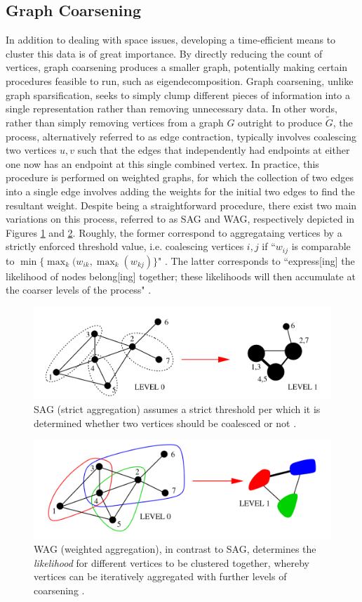 \documentclass{article}
\begin{document}
\subsection{Graph Coarsening}
In addition to dealing with space issues, developing a time-efficient means to cluster this data is of great importance. By directly reducing the count of vertices, graph coarsening produces a smaller graph, potentially making certain procedures feasible to run, such as eigendecomposition. Graph coarsening, unlike graph sparsification, seeks to simply clump different pieces of information into a single representation rather than removing unnecessary data. In other words, rather than simply removing vertices from a graph $G$ outright to produce $\widetilde{G}$, the process, alternatively referred to as edge contraction, typically involves coalescing two vertices $u,v$ such that the edges that independently had endpoints at either one now has an endpoint at this single combined vertex. In practice, this procedure is performed on weighted graphs, for which the collection of two edges into a single edge involves adding the weights for the initial two edges to find the resultant weight. Despite being a straightforward procedure, there exist two main variations on this process, referred to as SAG and WAG, respectively depicted in Figures \ref{fig:sag} and  \ref{fig:wag}. Roughly, the former correspond to aggregataing vertices by a strictly enforced threshold value, i.e. coalescing vertices $i,j$ if ``$w_{ij}$ is comparable to $\min\{\max_k(w_{ik}, \max_k(w_{kj})\}$" \cite{coarsening}. The latter corresponds to ``express[ing]  the likelihood of nodes belong[ing] together; these likelihoods will then accumulate at the coarser levels of the process" \cite{coarsening}. 

\begin{figure}
    \label{fig:sag}
    \centering
    \includegraphics[width=.60\textwidth]{sag.png}
    \caption[SAG Coarsening]{SAG (strict aggregation) assumes a strict threshold per which it is determined whether two vertices should be coalesced or not \cite{coarsening}.}
\end{figure}

\begin{figure}
    \label{fig:wag}
    \centering
    \includegraphics[width=.60\textwidth]{wag.png}
    \caption[WAG Coarsening]{WAG (weighted aggregation), in contrast to SAG, determines the \textit{likelihood} for different vertices to be clustered together, whereby vertices can be iteratively aggregated with further levels of coarsening \cite{coarsening}.}
\end{figure}
\end{document}
